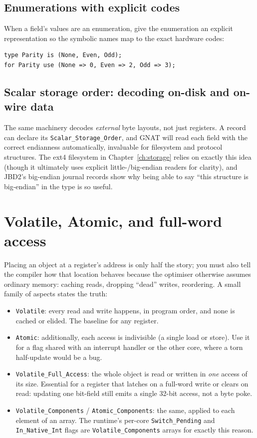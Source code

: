 \subsection{Enumerations with explicit codes}

When a field's values are an enumeration, give the enumeration an explicit
representation so the symbolic names map to the exact hardware codes:

\begin{lstlisting}
type Parity is (None, Even, Odd);
for Parity use (None => 0, Even => 2, Odd => 3);
\end{lstlisting}

\subsection{Scalar storage order: decoding on-disk and on-wire data}

The same machinery decodes \emph{external} byte layouts, not just registers. A
record can declare its \texttt{Scalar\_Storage\_Order}, and GNAT will read each
field with the correct endianness automatically, invaluable for filesystem
and protocol structures. The ext4 filesystem in Chapter~\ref{ch:storage} relies
on exactly this idea (though it ultimately uses explicit little-/big-endian
readers for clarity), and JBD2's big-endian journal records show why being able
to say ``this structure is big-endian'' in the type is so useful.

\section{Volatile, Atomic, and full-word access}
\label{sec:volatile}

Placing an object at a register's address is only half the story; you must also
tell the compiler how that location behaves because the optimiser otherwise
assumes ordinary memory: caching reads, dropping ``dead'' writes, reordering.
A small family of aspects states the truth:

\begin{itemize}
  \item \texttt{Volatile}: every read and write happens, in program order, and
        none is cached or elided. The baseline for any register.
  \item \texttt{Atomic}: additionally, each access is indivisible (a single
        load or store). Use it for a flag shared with an interrupt handler or the
        other core, where a torn half-update would be a bug.
  \item \texttt{Volatile\_Full\_Access}: the whole object is read or written in
        \emph{one} access of its size. Essential for a register that latches on a
        full-word write or clears on read: updating one bit-field still emits a
        single 32-bit access, not a byte poke.
  \item \texttt{Volatile\_Components} / \texttt{Atomic\_Components}: the same,
        applied to each element of an array. The runtime's per-core
        \texttt{Switch\_Pending} and \texttt{In\_Native\_Int} flags are
        \texttt{Volatile\_Components} arrays for exactly this reason.
\end{itemize}

